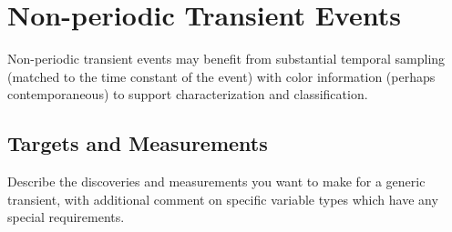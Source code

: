 
%
%
%
%
%
%

\section{Non-periodic Transient Events}
\label{sec:keyword} %



Non-periodic transient events may benefit from substantial temporal sampling (matched to the time constant of the
event) with color information (perhaps contemporaneous) to support characterization and classification.


\subsection{Targets and Measurements}
\label{sec:keyword:targets}

Describe the discoveries and measurements you want to make for a generic  transient,
with additional comment on specific variable types which have any special requirements.


